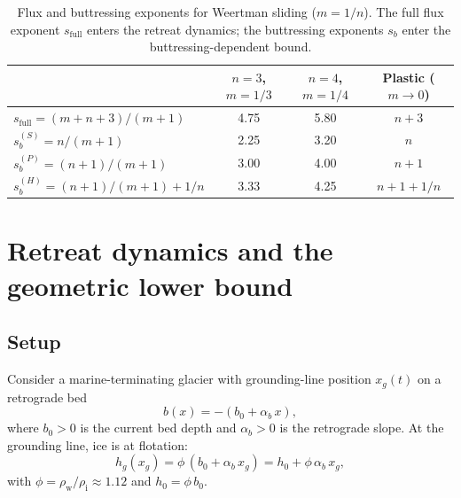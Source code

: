 \documentclass[11pt]{article}
\newcommand{\hg}{h_g}
\newcommand{\xg}{x_g}
\newcommand{\rhoi}{\rho_{\mathrm{i}}}
\newcommand{\rhow}{\rho_{\mathrm{w}}}
\begin{document}
\begin{table}[ht]
\centering
\caption{Flux and buttressing exponents for Weertman sliding ($m = 1/n$). The full flux exponent $s_{\mathrm{full}}$ enters the retreat dynamics; the buttressing exponents $s_b$ enter the buttressing-dependent bound.}
\label{tab:exponents}
\smallskip
\begin{tabular}{l c c c}
\toprule
& $n = 3$, $m = 1/3$ & $n = 4$, $m = 1/4$ & Plastic ($m\to0$) \\
\midrule
$s_{\mathrm{full}} = (m+n+3)/(m+1)$ & 4.75 & 5.80 & $n+3$ \\[4pt]
$s_b^{(S)} = n/(m+1)$ & 2.25 & 3.20 & $n$ \\
$s_b^{(P)} = (n+1)/(m+1)$ & 3.00 & 4.00 & $n+1$ \\
$s_b^{(H)} = (n+1)/(m+1) + 1/n$ & 3.33 & 4.25 & $n+1+1/n$ \\
\bottomrule
\end{tabular}
\end{table}


\section{Retreat dynamics and the geometric lower bound}
\label{sec:lower_bound}

\subsection{Setup}

Consider a marine-terminating glacier with grounding-line position $\xg(t)$ on a retrograde bed
\begin{equation}
	b(x) = -(b_0 + \alpha_b\, x),
	\label{eq:bed}
\end{equation}
where $b_0 > 0$ is the current bed depth and $\alpha_b > 0$ is the retrograde slope. At the grounding line, ice is at flotation:
\begin{equation}
	\hg(\xg) = \phi\,(b_0 + \alpha_b\, \xg) = h_0 + \phi\,\alpha_b\, \xg,
	\label{eq:flotation}
\end{equation}
with $\phi = \rhow/\rhoi \approx 1.12$ and $h_0 = \phi\, b_0$.
\end{document}
